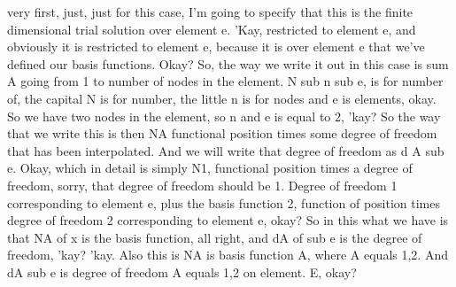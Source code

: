 \documentclass[10pt]{article}
\begin{document}
very first, just, just for this case, I'm going to specify that this is the finite dimensional trial solution over element e. 'Kay, restricted to element e, and obviously it is restricted to element e, because it is over element e that we've defined our basis functions. Okay? So, the way we write it out in this case is sum A going from 1 to number of nodes in the element. N sub n sub e, is for number of, the capital N is for number, the little n is for nodes and e is elements, okay. So we have two nodes in the element, so n and e is equal to 2, 'kay? So the way that we write this is then NA functional position times some degree of freedom that has been interpolated. And we will write that degree of freedom as d A sub e. Okay, which in detail is simply N1, functional position times a degree of freedom, sorry, that degree of freedom should be 1. Degree of freedom 1 corresponding to element e, plus the basis function 2, function of position times degree of freedom 2 corresponding to element e, okay? So in this what we have is that NA of x is the basis function, all right, and dA of sub e is the degree of freedom, 'kay? 'kay. Also this is NA is basis function A, where A equals 1,2. And dA sub e is degree of freedom A equals 1,2 on element. E, okay?
\end{document}
